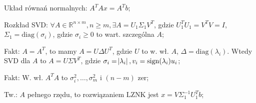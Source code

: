 \entry
Układ równań normalnych:
$A^TAx=A^Tb$;



\entry
Rozkład SVD:
$\forall A \in \mathbb{R}^{n\times m}, n \geq m, \exists A=U_1\Sigma_1V^T$, gdzie
$U_1^TU_1=V^TV=I$,
$\Sigma_1 = \mathrm{diag}(\sigma_i)$, gdzie
$\sigma_i \geq 0$ to wart. szczególna $A$;

\entry
Fakt:
$A=A^T$, to mamy $A=U\Delta U^T$, gdzie $U$ to w. wł. $A$,
$\Delta= \mathrm{diag}(\lambda_i)$.
Wtedy SVD dla $A$ to $A=U\Sigma V^T$, gdzie
$\sigma_i=\abs{\lambda_i}, v_i=\mathrm{sign}(\lambda_i)u_i$;

\entry
Fakt:
W. wł. $A^TA$ to $\sigma_i^2,\ldots,\sigma_m^2$ i $(n-m)$ zer;

\entry
Tw.:
$A$ pełnego rzędu, to rozwiązaniem LZNK jest $x=V\Sigma_1^{-1}U_1^Tb$;

